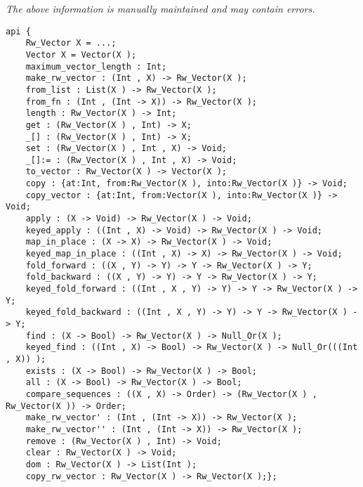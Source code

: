 \label{pkg:sparse\_rw\_vector}

{\tiny \it The above information is manually maintained and may contain errors.}
\begin{verbatim}
api {
    Rw_Vector X = ...;
    Vector X = Vector(X );
    maximum_vector_length : Int;
    make_rw_vector : (Int , X) -> Rw_Vector(X );
    from_list : List(X ) -> Rw_Vector(X );
    from_fn : (Int , (Int -> X)) -> Rw_Vector(X );
    length : Rw_Vector(X ) -> Int;
    get : (Rw_Vector(X ) , Int) -> X;
    _[] : (Rw_Vector(X ) , Int) -> X;
    set : (Rw_Vector(X ) , Int , X) -> Void;
    _[]:= : (Rw_Vector(X ) , Int , X) -> Void;
    to_vector : Rw_Vector(X ) -> Vector(X );
    copy : {at:Int, from:Rw_Vector(X ), into:Rw_Vector(X )} -> Void;
    copy_vector : {at:Int, from:Vector(X ), into:Rw_Vector(X )} -> Void;
    apply : (X -> Void) -> Rw_Vector(X ) -> Void;
    keyed_apply : ((Int , X) -> Void) -> Rw_Vector(X ) -> Void;
    map_in_place : (X -> X) -> Rw_Vector(X ) -> Void;
    keyed_map_in_place : ((Int , X) -> X) -> Rw_Vector(X ) -> Void;
    fold_forward : ((X , Y) -> Y) -> Y -> Rw_Vector(X ) -> Y;
    fold_backward : ((X , Y) -> Y) -> Y -> Rw_Vector(X ) -> Y;
    keyed_fold_forward : ((Int , X , Y) -> Y) -> Y -> Rw_Vector(X ) -> Y;
    keyed_fold_backward : ((Int , X , Y) -> Y) -> Y -> Rw_Vector(X ) -> Y;
    find : (X -> Bool) -> Rw_Vector(X ) -> Null_Or(X );
    keyed_find : ((Int , X) -> Bool) -> Rw_Vector(X ) -> Null_Or(((Int , X)) );
    exists : (X -> Bool) -> Rw_Vector(X ) -> Bool;
    all : (X -> Bool) -> Rw_Vector(X ) -> Bool;
    compare_sequences : ((X , X) -> Order) -> (Rw_Vector(X ) , Rw_Vector(X )) -> Order;
    make_rw_vector' : (Int , (Int -> X)) -> Rw_Vector(X );
    make_rw_vector'' : (Int , (Int -> X)) -> Rw_Vector(X );
    remove : (Rw_Vector(X ) , Int) -> Void;
    clear : Rw_Vector(X ) -> Void;
    dom : Rw_Vector(X ) -> List(Int );
    copy_rw_vector : Rw_Vector(X ) -> Rw_Vector(X );};
\end{verbatim}
